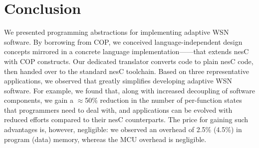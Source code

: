 \section{Conclusion}\label{sec:ending}

We presented programming abstractions for implementing adaptive WSN
software. By borrowing from COP, we conceived language-independent
design concepts mirrored in a concrete language
implementation---\conesc---that extends nesC with COP constructs. Our
dedicated translator converts \conesc code to plain nesC code, then
handed over to the standard nesC toolchain. Based on three
representative applications, we observed that \conesc greatly
simplifies developing adaptive WSN software. For example, we found
that, along with increased decoupling of software components, we gain
a $\approx$50\% reduction in the number of per-function states that
programmers need to deal with, and applications can be evolved with
reduced efforts compared to their nesC counterparts. The price for
gaining such advantages is, however, negligible: we observed an
overhead of 2.5\% (4.5\%) in program (data) memory, whereas the MCU
overhead is negligible.




